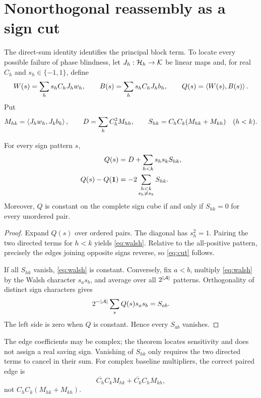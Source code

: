 \section{Nonorthogonal reassembly as a sign cut}

The direct-sum identity identifies the principal block term.  To locate every
possible failure of phase blindness, let $J_h:\mathcal H_h\to\mathcal K$ be linear maps and,
for real $C_h$ and $s_h\in\{-1,1\}$, define
\[
W(s)=\sum_hs_hC_hJ_hw_h,
\qquad
B(s)=\sum_hs_hC_hJ_hb_h,
\qquad Q(s)=\left\langle W(s),B(s)\right\rangle.
\]
Put
\[
M_{hk}=\left\langle J_hw_h,J_kb_k\right\rangle,\qquad
D=\sum_hC_h^2M_{hh},\qquad
S_{hk}=C_hC_k(M_{hk}+M_{kh})\quad(h<k).
\]

\begin{theorem}
For every sign pattern $s$,
\begin{align}
Q(s)&=D+\sum_{h<k}s_hs_kS_{hk},\label{eq:walsh}\\
Q(s)-Q(\mathbf 1)&=-2\sum_{\substack{h<k\\s_h\ne s_k}}S_{hk}.\label{eq:cut}
\end{align}
Moreover, $Q$ is constant on the complete sign cube if and only if
$S_{hk}=0$ for every unordered pair.
\end{theorem}

\begin{proof}
Expand $Q(s)$ over ordered pairs.  The diagonal has $s_h^2=1$.  Pairing the
two directed terms for $h<k$ yields \eqref{eq:walsh}.  Relative to the
all-positive pattern, precisely the edges joining opposite signs reverse, so
\eqref{eq:cut} follows.

If all $S_{hk}$ vanish, \eqref{eq:walsh} is constant.  Conversely, fix
$a<b$, multiply \eqref{eq:walsh} by the Walsh character $s_as_b$, and average
over all $2^{|\mathcal A|}$ patterns.  Orthogonality of distinct sign characters gives
\[
2^{-|\mathcal A|}\sum_sQ(s)s_as_b=S_{ab}.
\]
The left side is zero when $Q$ is constant.  Hence every $S_{ab}$ vanishes.
\end{proof}

The edge coefficients may be complex; the theorem locates sensitivity and
does not assign a real saving sign.  Vanishing of $S_{hk}$ only requires the
two directed terms to cancel in their sum.  For complex baseline multipliers,
the correct paired edge is
\[
\overline{C_h}C_kM_{hk}+\overline{C_k}C_hM_{kh},
\]
not $C_hC_k(M_{hk}+M_{kh})$.
